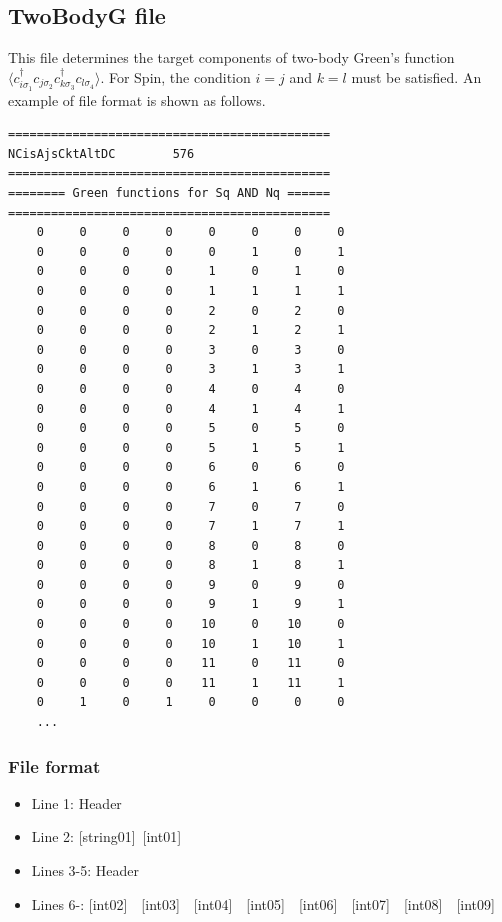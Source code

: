 \newpage
\subsection{TwoBodyG file}
\label{Subsec:twobodyg}
This file determines the target components of two-body Green's function $\langle c_{i\sigma_1}^{\dagger}c_{j\sigma_2}c_{k\sigma_3}^{\dagger}c_{l\sigma_4}\rangle$. {For Spin, the condition $i=j$ and $k=l$ must be satisfied.}
An example of file format is shown as follows.

\begin{minipage}{12.5cm}
\begin{screen}
\begin{verbatim}
=============================================
NCisAjsCktAltDC        576
=============================================
======== Green functions for Sq AND Nq ======
=============================================
    0     0     0     0     0     0     0     0
    0     0     0     0     0     1     0     1
    0     0     0     0     1     0     1     0
    0     0     0     0     1     1     1     1
    0     0     0     0     2     0     2     0
    0     0     0     0     2     1     2     1
    0     0     0     0     3     0     3     0
    0     0     0     0     3     1     3     1
    0     0     0     0     4     0     4     0
    0     0     0     0     4     1     4     1
    0     0     0     0     5     0     5     0
    0     0     0     0     5     1     5     1
    0     0     0     0     6     0     6     0
    0     0     0     0     6     1     6     1
    0     0     0     0     7     0     7     0
    0     0     0     0     7     1     7     1
    0     0     0     0     8     0     8     0
    0     0     0     0     8     1     8     1
    0     0     0     0     9     0     9     0
    0     0     0     0     9     1     9     1
    0     0     0     0    10     0    10     0
    0     0     0     0    10     1    10     1
    0     0     0     0    11     0    11     0
    0     0     0     0    11     1    11     1
    0     1     0     1     0     0     0     0
    ...
\end{verbatim}
\end{screen}
\end{minipage}

\subsubsection{File format}
 \begin{itemize}
   \item  Line 1:  Header
   \item  Line 2:   [string01]~[int01]
   \item  Lines 3-5:  Header
   \item  Lines 6-: 
   [int02]~~[int03]~~[int04]~~[int05]~~[int06]~~[int07]~~[int08]~~[int09]
  \end{itemize}
